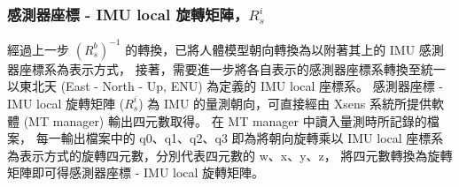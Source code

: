 
\subsubsection{感測器座標 - IMU local 旋轉矩陣，$R^i_s$}
經過上一步 $(R^b_s)^{-1}$ 的轉換，已將人體模型朝向轉換為以附著其上的 IMU 感測器座標系為表示方式，
接著，需要進一步將各自表示的感測器座標系轉換至統一以東北天 (East - North - Up, ENU) 為定義的 IMU local 座標系。
感測器座標 - IMU local 旋轉矩陣 ($R^i_s$) 為 IMU 的量測朝向，可直接經由 Xsens 系統所提供軟體 (MT manager) 輸出四元數取得。
在 MT manager 中讀入量測時所記錄的檔案，
每一輸出檔案中的 q0、q1、q2、q3 即為將朝向旋轉乘以 IMU local 座標系為表示方式的旋轉四元數，分別代表四元數的 w、x、y、z，
將四元數轉換為旋轉矩陣即可得感測器座標 - IMU local 旋轉矩陣。

